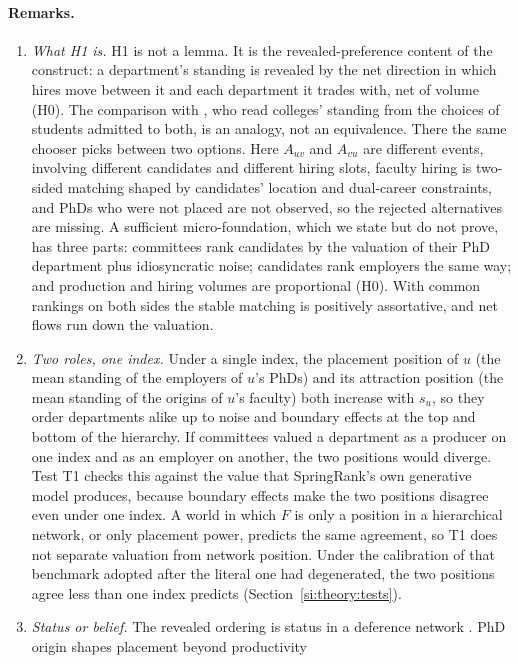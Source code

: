 \documentclass[11pt]{article}
\begin{document}
\paragraph{Remarks.}
\begin{enumerate}
\item \emph{What H1 is.} H1 is not a lemma. It is the revealed-preference content of the construct: a
department's standing is revealed by the net direction in which hires move between it and each department it
trades with, net of volume (H0). The comparison with \citet{avery2013revealed}, who read colleges' standing from
the choices of students admitted to both, is an analogy, not an equivalence. There the same chooser picks between
two options. Here $A_{uv}$ and $A_{vu}$ are different events, involving different candidates and different
hiring slots, faculty hiring is two-sided matching shaped by candidates' location and dual-career constraints,
and PhDs who were not placed are not observed, so the rejected alternatives are missing. A sufficient
micro-foundation, which we state but do not prove, has three parts: committees rank candidates by the valuation of
their PhD department plus idiosyncratic noise; candidates rank employers the same way; and production and hiring
volumes are proportional (H0). With common rankings on both sides the stable matching \citep{gale1962college} is
positively assortative, and net flows run down the valuation.
\item \emph{Two roles, one index.} Under a single index, the placement position of $u$ (the mean standing of the
employers of $u$'s PhDs) and its attraction position (the mean standing of the origins of $u$'s faculty) both
increase with $s_u$, so they order departments alike up to noise and boundary effects at the top and bottom of
the hierarchy. If committees valued a department as a producer on one index and as an employer on another, the two
positions would diverge. Test T1 checks this against the value that SpringRank's own generative model produces,
because boundary effects make the two positions disagree even under one index. A world in which $F$ is only a
position in a hierarchical network, or only placement power, predicts the same agreement, so T1 does not separate
valuation from network position. Under the calibration of that benchmark adopted after the literal one had
degenerated, the two positions agree less than one index predicts (Section~\ref{si:theory:tests}).
\item \emph{Status or belief.} The revealed ordering is status in a deference network
\citep{burris2004academic,podolny1993status,sauder2012status}. PhD origin shapes placement beyond productivity

\end{enumerate}
\end{document}
